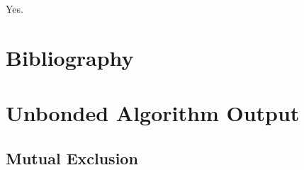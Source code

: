\documentclass{llncs}
\begin{document}
Yes.

\section{Bibliography}




\appendix

\section{Unbonded Algorithm Output}

\subsection{Mutual Exclusion \label{mc:app:unb:mutex}}
\end{document}
